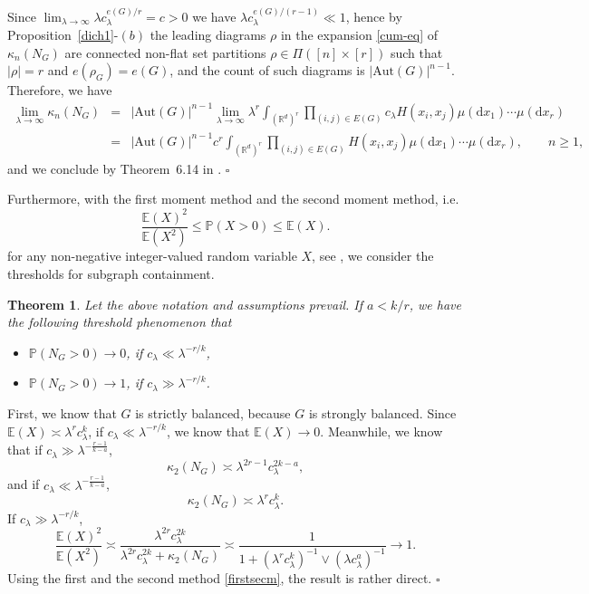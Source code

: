 \documentclass[12pt]{article}
\newcommand{\R}{\mathbb{R}}
\newcommand{\E}{\mathbb{E}}
\newcommand{\IP}{\mathbb{P}}
\newtheorem{thm}[prop]{Theorem}
\newenvironment{Proof}{\removelastskip\par\medskip
\noindent{\em Proof.} \rm}{\penalty-20\null\hfill$\square$\par\medbreak}
\numberwithin{equation}{section}
\begin{document}
\begin{Proof}
 Since $\lim_{\lambda \to \infty} \lambda c_\lambda^{e(G)/r} = c>0$
 we have $\lambda c_\lambda^{e(G)/ ( r-1 )}\ll1$, 
 hence by Proposition~\ref{dich1}-$(b)$ the leading
 diagrams $\rho$ in the expansion \eqref{cum-eq} of $\kappa_n(N_G)$
 are connected non-flat set partitions $\rho\in\Pi([n]\times[r])$
 such that $|\rho|=r$ and $e(\rho_G)=e(G)$,
 and the count of such diagrams is $|\mathrm{Aut}(G)|^{n-1}$.
 Therefore, we have 
    \begin{eqnarray*}
      \lim_{\lambda\to\infty}\kappa_n(N_G) & = &
      |\mathrm{Aut}(G)|^{n-1}
      \lim_{\lambda\to\infty}\lambda^r 
      \int_{(\R^d)^r}\prod_{(i,j)\in E(G)}
      c_\lambda H(x_i,x_j)\mu(\mathrm{d}x_1)\cdots\mu(\mathrm{d}x_r)
      \\
      &=&|\mathrm{Aut}(G)|^{n-1} c^r\int_{(\R^d)^r}\prod_{(i,j)\in E(G)}H(x_i,x_j)\mu(\mathrm{d}x_1)\cdots\mu(\mathrm{d}x_r), \qquad n \geq 1, 
    \end{eqnarray*}
    and we conclude by Theorem~6.14 in \cite{JLR11}. 
\end{Proof}
Furthermore, with the first moment method and the second moment method, i.e. 
\begin{equation}\label{firstsecm}
\frac{\E(X)^2}{\E(X^2)}\le\IP(X>0)\le \E(X).
\end{equation}
for any non-negative integer-valued random variable $X$, see \cite[Page~54]{JLR11}, we consider the thresholds for subgraph containment. 
\begin{thm}
Let the above notation and assumptions prevail. If $a<k/r$, we have the following threshold phenomenon that 
\begin{itemize}
\item $\IP(N_G>0)\to0$, if $c_\lambda\ll\lambda^{-r/k}$,
\item $\IP(N_G>0)\to1$, if $c_\lambda\gg\lambda^{-r/k}$.
\end{itemize}
\end{thm}
\begin{Proof}
First, we know that $G$ is strictly balanced, because $G$ is strongly balanced. Since $\E(X)\asymp\lambda^{r}c_\lambda^{k}$, if $c_\lambda\ll\lambda^{-r/k}$, we know that $\E(X)\to0.$ Meanwhile, we know that if $c_\lambda\gg\lambda^{-\frac{r-1}{k-a}}$, 
$$\kappa_2(N_G)\asymp\lambda^{2r-1}c_{\lambda}^{2k-a},$$
and if $c_\lambda\ll\lambda^{-\frac{r-1}{k-a}}$, 
$$\kappa_2(N_G)\asymp\lambda^{r}c_{\lambda}^{k}.$$
If $c_\lambda\gg\lambda^{-r/k}$, 
\begin{equation}
\frac{\E(X)^2}{\E(X^2)}\asymp\frac{\lambda^{2r}c_\lambda^{2k}}{\lambda^{2r}c_\lambda^{2k}+\kappa_2(N_G)}\asymp\frac1{1+(\lambda^{r}c_{\lambda}^k)^{-1}\vee(\lambda c_\lambda^{a})^{-1}}\to1.
\end{equation}
Using the first and the second method \eqref{firstsecm}, the result is rather direct.
\end{Proof}
\end{document}
